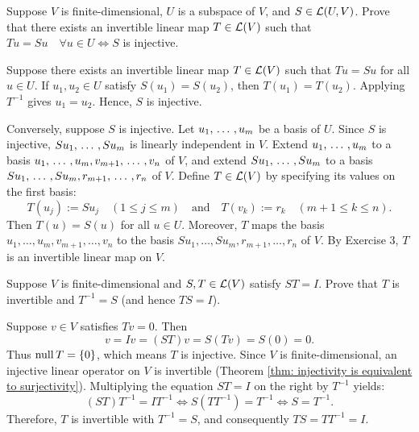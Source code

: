 \begin{xrcs}
  Suppose $V$ is finite-dimensional, $U$ is a subspace of $V$, and $S \in \mathcal{L}(U,V)$. Prove that there exists an invertible linear map $T \in \mathcal{L}(V)$ such that $Tu = Su \quad \forall u \in U \iff S$ is injective.

  \begin{xprf}
    \Rightarrowdirection Suppose there exists an invertible linear map $T \in \mathcal{L}(V)$ such that $Tu = Su$ for all $u \in U$.
    If $u_1, u_2 \in U$ satisfy $S(u_1) = S(u_2)$, then $T(u_1) = T(u_2)$.
    Applying $T^{-1}$ gives $u_1 = u_2$. Hence, $S$ is injective.

    \Leftarrowdirection Conversely, suppose $S$ is injective. Let $u_1, {\, \ldots \,\,}, u_m$ be a basis of $U$.
    Since $S$ is injective, $Su_1, {\, \ldots \,\,}, Su_m$ is linearly independent in $V$.
    Extend $u_1, {\, \ldots \,\,}, u_m$ to a basis $u_1, {\, \ldots \,\,}, u_m, v_{m+1}, {\, \ldots \,\,}, v_n$ of $V$, and extend $Su_1, {\, \ldots \,\,}, Su_m$ to a basis $Su_1, {\, \ldots \,\,}, Su_m, r_{m+1}, {\, \ldots \,\,}, r_n$ of $V$.
    Define $T \in \mathcal{L}(V)$ by specifying its values on the first basis:
    \begin{equation}
      T(u_j) := Su_j \quad (1 \le j \le m) \quad \text{and} \quad T(v_k) := r_k \quad (m+1 \le k \le n).
    \end{equation}
    Then $T(u) = S(u)$ for all $u \in U$.
    Moreover, $T$ maps the basis $u_1, \dots, u_m, v_{m+1}, \dots, v_n$ to the basis $Su_1, \dots, Su_m, r_{m+1}, \dots, r_n$ of $V$.
    By Exercise 3, $T$ is an invertible linear map on $V$.
  \end{xprf}
\end{xrcs}

\begin{xrcs}
  Suppose $V$ is finite-dimensional and $S, T \in \mathcal{L}(V)$ satisfy $ST = I$. Prove that $T$ is invertible and $T^{-1} = S$ (and hence $TS = I$).
\begin{xprf}
  Suppose $v \in V$ satisfies $Tv = 0$. Then
  \[
    v = Iv = (ST)v = S(Tv) = S(0) = 0.
  \]
  Thus $\operatorname{null} T = \{0\}$, which means $T$ is injective.
  Since $V$ is finite-dimensional, an injective linear operator on $V$ is invertible (Theorem \ref{thm: injectivity is equivalent to surjectivity}).
  Multiplying the equation $ST = I$ on the right by $T^{-1}$ yields:
  \[
    (ST)T^{-1} = I T^{-1} \iff S(TT^{-1}) = T^{-1} \iff S = T^{-1}.
  \]
  Therefore, $T$ is invertible with $T^{-1} = S$, and consequently $TS = T T^{-1} = I$.
\end{xprf}
\end{xrcs}

